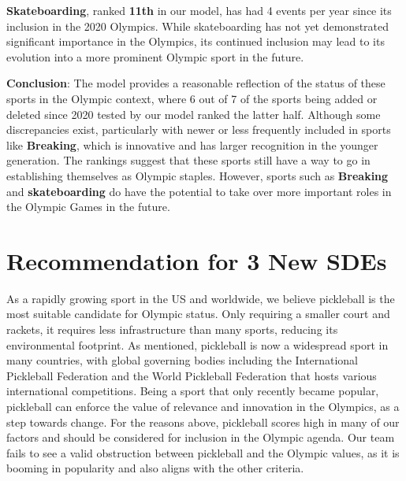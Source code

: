 \documentclass[12pt]{article}
\begin{document}
\textbf{Skateboarding}, ranked \textbf{11th} in our model, has had 4 events per year since its inclusion in the 2020 Olympics. While skateboarding has not yet demonstrated significant importance in the Olympics, its continued inclusion may lead to its evolution into a more prominent Olympic sport in the future.

\textbf{Conclusion}: The model provides a reasonable reflection of the status of these sports in the Olympic context, where 6 out of 7 of the sports being added or deleted since 2020 tested by our model ranked the latter half. Although some discrepancies exist, particularly with newer or less frequently included in sports like \textbf{Breaking}, which is innovative and has larger recognition in the younger generation. The rankings suggest that these sports still have a way to go in establishing themselves as Olympic staples. However, sports such as \textbf{Breaking} and \textbf{skateboarding} do have the potential to take over more important roles in the Olympic Games in the future. 

\section{Recommendation for 3 New SDEs}
As a rapidly growing sport in the US and worldwide, we believe pickleball is the most suitable candidate for Olympic status. Only requiring a smaller court and rackets, it requires less infrastructure than many sports, reducing its environmental footprint. As mentioned, pickleball is now a widespread sport in many countries, with global governing bodies including the International Pickleball Federation and the World Pickleball Federation that hosts various international competitions. Being a sport that only recently became popular, pickleball can enforce the value of relevance and innovation in the Olympics, as a step towards change. For the reasons above, pickleball scores high in many of our factors and should be considered for inclusion in the Olympic agenda. Our team fails to see a valid obstruction between pickleball and the Olympic values, as it is booming in popularity and also aligns with the other criteria.
\end{document}
